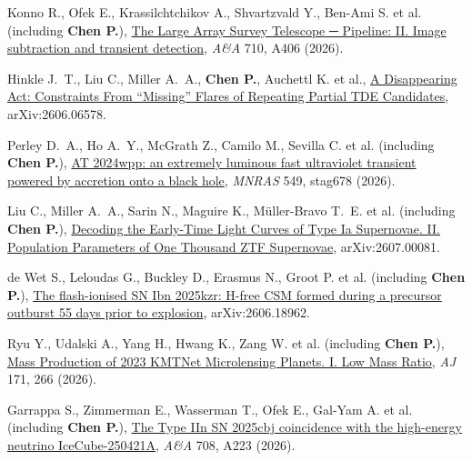 
\item Konno R., Ofek E., Krassilchtchikov A., Shvartzvald Y., Ben-Ami S. et al. (including \textbf{Chen P.}), \href{https://ui.adsabs.harvard.edu/abs/2026A&A...710A.406K}{The Large Array Survey Telescope ─ Pipeline: II. Image subtraction and transient detection}, \textit{A\&A} 710, A406 (2026).

\item Hinkle J.~T., Liu C., Miller A.~A., \textbf{Chen P.}, Auchettl K. et al., \href{https://ui.adsabs.harvard.edu/abs/2026arXiv260606578H}{A Disappearing Act: Constraints From ``Missing'' Flares of Repeating Partial TDE Candidates}, arXiv:2606.06578.

\item Perley D.~A., Ho A.~Y., McGrath Z., Camilo M., Sevilla C. et al. (including \textbf{Chen P.}), \href{https://ui.adsabs.harvard.edu/abs/2026MNRAS.549ag678P}{AT 2024wpp: an extremely luminous fast ultraviolet transient powered by accretion onto a black hole}, \textit{MNRAS} 549, stag678 (2026).

\item Liu C., Miller A.~A., Sarin N., Maguire K., M{\"u}ller-Bravo T.~E. et al. (including \textbf{Chen P.}), \href{https://ui.adsabs.harvard.edu/abs/2026arXiv260700081L}{Decoding the Early-Time Light Curves of Type Ia Supernovae. II. Population Parameters of One Thousand ZTF Supernovae}, arXiv:2607.00081.

\item de Wet S., Leloudas G., Buckley D., Erasmus N., Groot P. et al. (including \textbf{Chen P.}), \href{https://ui.adsabs.harvard.edu/abs/2026arXiv260618962D}{The flash-ionised SN Ibn 2025kzr: H-free CSM formed during a precursor outburst 55 days prior to explosion}, arXiv:2606.18962.

\item Ryu Y., Udalski A., Yang H., Hwang K., Zang W. et al. (including \textbf{Chen P.}), \href{https://ui.adsabs.harvard.edu/abs/2026AJ....171..266R}{Mass Production of 2023 KMTNet Microlensing Planets. I. Low Mass Ratio}, \textit{AJ} 171, 266 (2026).

\item Garrappa S., Zimmerman E., Wasserman T., Ofek E., Gal-Yam A. et al. (including \textbf{Chen P.}), \href{https://ui.adsabs.harvard.edu/abs/2026A&A...708A.223G}{The Type IIn SN 2025cbj coincidence with the high-energy neutrino IceCube-250421A}, \textit{A\&A} 708, A223 (2026).

